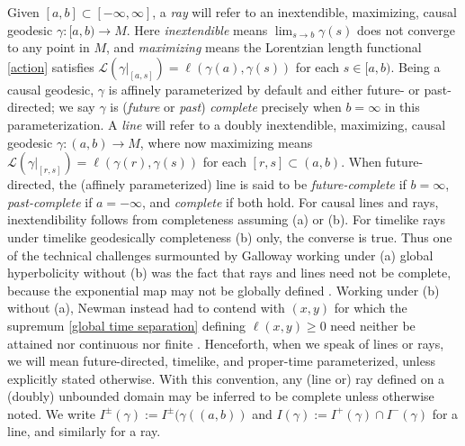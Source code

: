 \documentclass[12pt]{amsart}
\newcommand{\LL}{\mathcal{L}}
\newcommand{\orange}{\color{orange}}
\begin{document}
Given $[a,b] \subset [-\infty,\infty]$,
a {\em ray} will refer to an inextendible, 
maximizing, causal geodesic $\gamma:[a,b)\longrightarrow M$.
Here {\em inextendible} means $\lim_{s\to b} \gamma(s)$ does not converge to any point in $M$,
and {\em maximizing} means the Lorentzian length functional 
\eqref{action} satisfies
$\LL(\gamma|_{[a,s]})=\ell(\gamma(a),\gamma(s))$
for each $s\in [a,b)$.
Being a causal geodesic,  $\gamma$ is affinely parameterized by default and either future- or past-directed; we say $\gamma$ is ({\em future} or {\em past}) {\em complete} precisely when $b=\infty$ in this parameterization.
A {\em line} will refer to a doubly inextendible, 
maximizing, causal geodesic $\gamma:(a,b) \longrightarrow M$,
where now maximizing means $\LL(\gamma|_{[r,s]})=\ell(\gamma(r),\gamma(s))$
for each $[r,s]\subset (a,b)$.
When future-directed, the (affinely parameterized) line is said to be {\em future-complete} if $b=\infty$, {\em past-complete} if $a=-\infty$, and {\em complete} if both hold. For causal lines and rays, inextendibility follows from completeness assuming (a) or (b).  For timelike rays 
{under timelike geodesically completeness} (b) only,  the converse is true.
Thus one of the technical challenges surmounted by Galloway working under (a) {global hyperbolicity} without (b) was the fact that rays and lines need not be complete, because the exponential map may not be globally defined \cite{Galloway89}.  Working under (b) without (a), Newman instead had to contend with $(x,y)$ for which the supremum \eqref{global time separation} defining 
$\ell(x,y) \ge 0$ need neither be attained nor continuous nor finite \cite{Newman90}.
Henceforth, when we speak of lines or rays, we will mean future-directed, timelike, and proper-time parameterized, unless explicitly stated otherwise.
With this convention,  any (line or) ray defined on a (doubly) unbounded domain may be inferred to be complete 
unless otherwise noted.
We write $I^\pm(\gamma):= I^\pm(\gamma((a,b))$ and $I(\gamma):= I^+(\gamma)\cap I^-(\gamma)$ for a line, and similarly for a ray.
\end{document}
